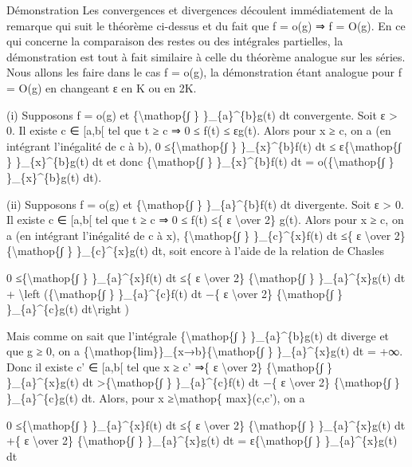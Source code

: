 \documentclass[]{article}
\begin{document}
Démonstration Les convergences et divergences découlent immédiatement de
la remarque qui suit le théorème ci-dessus et du fait que f = o(g) ⇒ f =
O(g). En ce qui concerne la comparaison des restes ou des intégrales
partielles, la démonstration est tout à fait similaire à celle du
théorème analogue sur les séries. Nous allons les faire dans le cas f =
o(g), la démonstration étant analogue pour f = O(g) en changeant ε en K
ou en 2K.

(i) Supposons f = o(g) et \{\textbackslash{}mathop\{∫ \}
\}\_\{a\}\^{}\{b\}g(t) dt convergente. Soit ε \textgreater{} 0. Il
existe c ∈ {[}a,b{[} tel que t ≥ c ⇒ 0 ≤ f(t) ≤ εg(t). Alors pour x ≥ c,
on a (en intégrant l'inégalité de c à b), 0 ≤\{\textbackslash{}mathop\{∫
\} \}\_\{x\}\^{}\{b\}f(t) dt ≤ ε\{\textbackslash{}mathop\{∫ \}
\}\_\{x\}\^{}\{b\}g(t) dt et donc \{\textbackslash{}mathop\{∫ \}
\}\_\{x\}\^{}\{b\}f(t) dt = o(\{\textbackslash{}mathop\{∫ \}
\}\_\{x\}\^{}\{b\}g(t) dt).

(ii) Supposons f = o(g) et \{\textbackslash{}mathop\{∫ \}
\}\_\{a\}\^{}\{b\}f(t) dt divergente. Soit ε \textgreater{} 0. Il existe
c ∈ {[}a,b{[} tel que t ≥ c ⇒ 0 ≤ f(t) ≤\{ ε \textbackslash{}over 2\}
g(t). Alors pour x ≥ c, on a (en intégrant l'inégalité de c à x),
\{\textbackslash{}mathop\{∫ \} \}\_\{c\}\^{}\{x\}f(t) dt ≤\{ ε
\textbackslash{}over 2\} \{\textbackslash{}mathop\{∫ \}
\}\_\{c\}\^{}\{x\}g(t) dt, soit encore à l'aide de la relation de
Chasles

0 ≤\{\textbackslash{}mathop\{∫ \} \}\_\{a\}\^{}\{x\}f(t) dt ≤\{ ε
\textbackslash{}over 2\} \{\textbackslash{}mathop\{∫ \}
\}\_\{a\}\^{}\{x\}g(t) dt + \textbackslash{}left
(\{\textbackslash{}mathop\{∫ \} \}\_\{a\}\^{}\{c\}f(t) dt −\{ ε
\textbackslash{}over 2\} \{\textbackslash{}mathop\{∫ \}
\}\_\{a\}\^{}\{c\}g(t) dt\textbackslash{}right )

Mais comme on sait que l'intégrale \{\textbackslash{}mathop\{∫ \}
\}\_\{a\}\^{}\{b\}g(t) dt diverge et que g ≥ 0, on a
\{\textbackslash{}mathop\{lim\}\}\_\{x→b\}\{\textbackslash{}mathop\{∫ \}
\}\_\{a\}\^{}\{x\}g(t) dt = +∞. Donc il existe c' ∈ {[}a,b{[} tel que x
≥ c' ⇒\{ ε \textbackslash{}over 2\} \{\textbackslash{}mathop\{∫ \}
\}\_\{a\}\^{}\{x\}g(t) dt \textgreater{}\{\textbackslash{}mathop\{∫ \}
\}\_\{a\}\^{}\{c\}f(t) dt −\{ ε \textbackslash{}over 2\}
\{\textbackslash{}mathop\{∫ \} \}\_\{a\}\^{}\{c\}g(t) dt. Alors, pour x
≥\textbackslash{}mathop\{ max\}(c,c'), on a

0 ≤\{\textbackslash{}mathop\{∫ \} \}\_\{a\}\^{}\{x\}f(t) dt ≤\{ ε
\textbackslash{}over 2\} \{\textbackslash{}mathop\{∫ \}
\}\_\{a\}\^{}\{x\}g(t) dt +\{ ε \textbackslash{}over 2\}
\{\textbackslash{}mathop\{∫ \} \}\_\{a\}\^{}\{x\}g(t) dt =
ε\{\textbackslash{}mathop\{∫ \} \}\_\{a\}\^{}\{x\}g(t) dt
\end{document}
